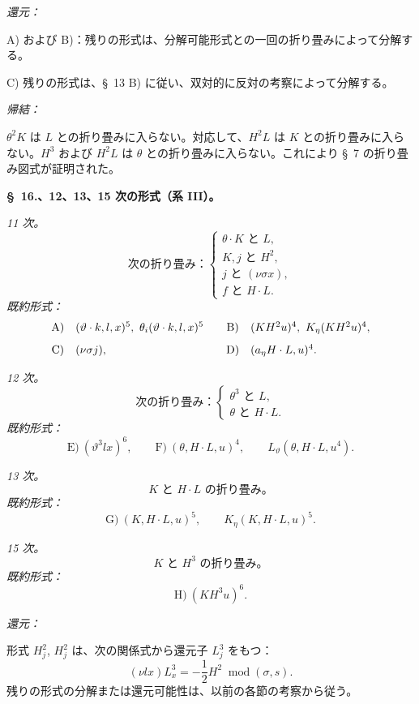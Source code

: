 \documentclass[11pt]{article}
\newcommand{\modu}[1]{\;\operatorname{mod} #1}
\begin{document}
\noindent\emph{還元：}

A) および B)：残りの形式は、分解可能形式との一回の折り畳みによって分解する。

C) 残りの形式は、\S\ 13 B) に従い、双対的に反対の考察によって分解する。

\noindent\emph{帰結：}

$\theta^2K$ は $L$ との折り畳みに入らない。対応して、$H^2L$ は $K$ との折り畳みに入らない。$H^3$ および $H^2L$ は $\theta$ との折り畳みに入らない。これにより \S\ 7 の折り畳み図式が証明された。

\begin{center}
\textbf{\S\ 16.、12、13、15 次の形式（系 III）。}
\end{center}

\noindent\emph{11 次。}
\[
\text{次の折り畳み：}\left\{\begin{array}{l}
\theta\cdot K\text{ と }L,\\
K,j\text{ と }H^2,\\
j\text{ と }(\nu\sigma x),\\
f\text{ と }H\cdot L.
\end{array}\right.
\]
\noindent\emph{既約形式：}
\[
\begin{array}{c@{\quad}l@{\qquad}c@{\quad}l}
\text{A)}&(\vartheta\cdot k,l,x)^5,
\ \theta_i(\vartheta\cdot k,l,x)^5&
\text{B)}&(KH^2u)^4,
\ K_\eta(KH^2u)^4,\\[0.8em]
\text{C)}&(\nu\sigma j),&
\text{D)}&(a_\eta H\cdot L,u)^4.
\end{array}
\]

\noindent\emph{12 次。}
\[
\text{次の折り畳み：}\left\{\begin{array}{l}
\theta^3\text{ と }L,\\
\theta\text{ と }H\cdot L.
\end{array}\right.
\]
\noindent\emph{既約形式：}
\[
\text{E)}\ (\vartheta^3lx)^6,
\qquad
\text{F)}\ (\theta,H\cdot L,u)^4,
\qquad L_\vartheta(\theta,H\cdot L,u^4).
\]

\noindent\emph{13 次。}
\[
K\text{ と }H\cdot L\text{ の折り畳み。}
\]
\noindent\emph{既約形式：}
\[
\text{G)}\ (K,H\cdot L,u)^5,
\qquad K_\eta(K,H\cdot L,u)^5.
\]

\noindent\emph{15 次。}
\[
K\text{ と }H^3\text{ の折り畳み。}
\]
\noindent\emph{既約形式：}
\[
\text{H)}\ (KH^3u)^6.
\]

\noindent\emph{還元：}

形式 $H_j^2$, $H_j^2$ は、次の関係式から還元子 $L_j^3$ をもつ：
\[
(\nu lx)L_x^3=-\frac12H^2\modu{(\sigma,s)}.
\]
残りの形式の分解または還元可能性は、以前の各節の考察から従う。
\end{document}
